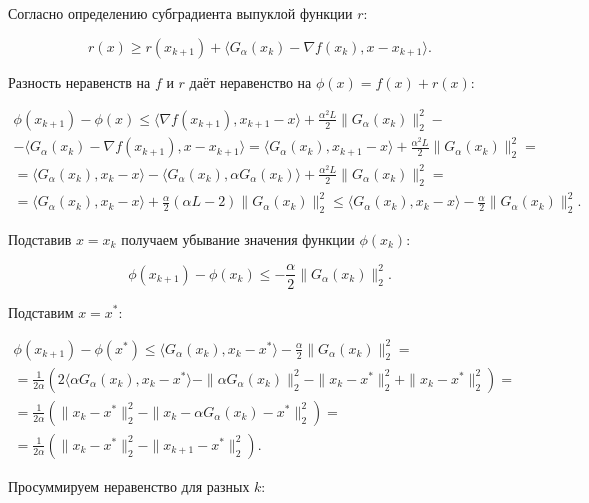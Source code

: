 Согласно определению субградиента выпуклой функции $r$:

\begin{equation}
    r(x)\geq r(x_{k+1})+\langle G_\alpha(x_k)-\nabla f(x_k),x-x_{k+1}\rangle.
\end{equation}

Разность неравенств на $f$ и $r$ даёт неравенство на $\phi(x)=f(x)+r(x)$:

\begin{equation}
\begin{aligned}
    \phi(x_{k+1})-\phi(x)\leq\langle\nabla f(x_{k+1}),x_{k+1}-x\rangle+\frac{\alpha^2L}2\|G_\alpha(x_k)\|_2^2-\\-\langle G_\alpha(x_k)-\nabla f(x_{k+1}),x-x_{k+1}\rangle=
    \langle G_\alpha(x_k),x_{k+1}-x\rangle+\frac{\alpha^2L}2\|G_\alpha(x_k)\|_2^2=\\=
    \langle G_\alpha(x_k),x_k-x\rangle-\langle G_\alpha(x_k),\alpha G_\alpha(x_k)\rangle+\frac{\alpha^2L}2\|G_\alpha(x_k)\|_2^2=\\=
    \langle G_\alpha(x_k),x_k-x\rangle+\frac\alpha2(\alpha L-2)\|G_\alpha(x_k)\|_2^2\leq
    \langle G_\alpha(x_k),x_k-x\rangle-\frac\alpha2\|G_\alpha(x_k)\|_2^2.
\end{aligned}
\end{equation}

Подставив $x=x_k$ получаем убывание значения функции $\phi(x_k)$:

\begin{equation}
    \phi(x_{k+1})-\phi(x_k)\leq-\frac\alpha2\|G_\alpha(x_k)\|_2^2.
\end{equation}

Подставим $x=x^*$:

\begin{equation}
\begin{aligned}
    \phi(x_{k+1})-\phi(x^*)\leq
    \langle G_\alpha(x_k),x_k-x^*\rangle-\frac\alpha2\|G_\alpha(x_k)\|_2^2=\\=
    \frac1{2\alpha}\left(2\langle\alpha G_\alpha(x_k),x_k-x^*\rangle-\|\alpha G_\alpha(x_k)\|_2^2-\|x_k-x^*\|_2^2+\|x_k-x^*\|_2^2\right)=\\=
    \frac1{2\alpha}\left(\|x_k-x^*\|_2^2-\|x_k-\alpha G_\alpha(x_k)-x^*\|_2^2\right)=\\=
    \frac1{2\alpha}\left(\|x_k-x^*\|_2^2-\|x_{k+1}-x^*\|_2^2\right).
\end{aligned}
\end{equation}

Просуммируем неравенство для разных $k$:

